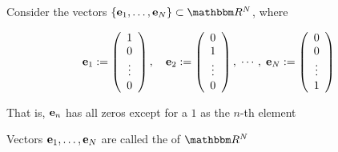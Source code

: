     
%    
%
    


    
    


\begin{frame}
    
    \vspace{2em}
    \Eg 
    Consider the vectors $\{\bolde_1, \ldots, \bolde_N\} \subset \RR^N$, where

    \begin{equation*}
        {\mathbf e}_1 := 
        \left(
        \begin{array}{c}
            1 \\
            0 \\
            \vdots \\
            0
        \end{array}
        \right),
        \quad 
        {\mathbf e}_2 := 
        \left(
        \begin{array}{c}
            0 \\
            1 \\
            \vdots \\
            0
        \end{array}
        \right),
        \; 
        \cdots,
        \;
        {\mathbf e}_N := 
        \left(
        \begin{array}{c}
            0 \\
            0 \\
            \vdots \\
            1
        \end{array}
        \right)
    \end{equation*}

    \vspace{1em}

    That is, ${\mathbf e}_n$ has all zeros except for a $1$ as the $n$-th element
    
    \vspace{1em}

    Vectors ${\mathbf e}_1, \ldots, {\mathbf e}_N$ are called the
     of $\RR^N$

\end{frame}

